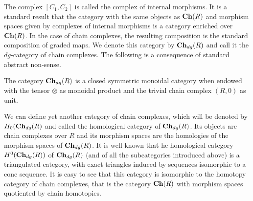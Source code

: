 The complex $[C_1,C_2]$ is called the complex of internal morphisms. It is a standard result that the category with the same objects as $\mathbf{Ch}(R)$ and morphism spaces given by complexes of internal morphisms is a category enriched over $\mathbf{Ch}(R)$. In the case of chain complexes, the resulting composition is the standard composition of graded maps. We denote this category by $\mathbf{Ch}_{dg}(R)$ and call it the $dg$-category of chain complexes.
The following is a consequence of standard abstract non-sense.


\begin{lem}
   The category $\mathbf{Ch}_{dg}(R)$ is a closed symmetric monoidal category when endowed with the tensor $\otimes$ as monoidal product and the trivial chain complex $(R,0)$ as unit. 
\end{lem}

We can define yet another category of chain complexes, which will be denoted by $H_0(\mathbf{Ch}_{dg}(R)$ and called the homological category of $\mathbf{Ch}_{dg}(R)$. Its objects are chain complexes over $R$ and its morphism spaces are the homologies of the morphism spaces of $\mathbf{Ch}_{dg}(R)$. It is well-known that he homological category $H^0(\mathbf{Ch}_{dg}(R))$ of $\mathbf{Ch}_{dg}(R)$ (and of all the subcategories introduced above) is a triangulated category, with exact triangles induced by sequences isomorphic to a cone sequence. It is easy to see that this category is isomorphic to the homotopy category of chain complexes, that is the category $\mathbf{Ch}(R)$ with morphism spaces quotiented by chain homotopies.





